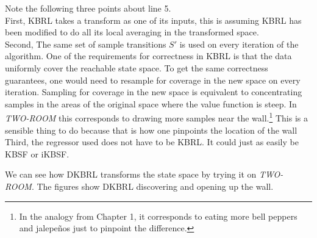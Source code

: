 Note the following three points about line 5.\\
First, KBRL takes a transform as one of its inputs, this is assuming
KBRL has been modified to do all its local averaging in the transformed
space.\\
Second, The same set of sample transitions $S'$ is used on every
iteration of the algorithm.
One of the requirements for correctness in KBRL is that the data uniformly
cover the reachable state space.
To get the same correctness guarantees,
one would need to resample for coverage in the new space on every iteration.
Sampling for coverage in the new space is equivalent to concentrating samples
in the areas of the original space where the value function is steep.
In \textit{TWO-ROOM} this corresponds to drawing more samples near the
wall.\footnote{
In the analogy from Chapter 1, it corresponds to eating more bell peppers and
jalepe\~{n}os just to pinpoint the difference.}
This is a sensible thing to do because that is how one pinpoints the location
of the wall\\
Third, the regressor used does not have to be KBRL.
It could just as easily be KBSF or iKBSF.

We can see how DKBRL transforms the state space by trying it on
\textit{TWO-ROOM}. The figures show DKBRL discovering and opening up
the wall.

